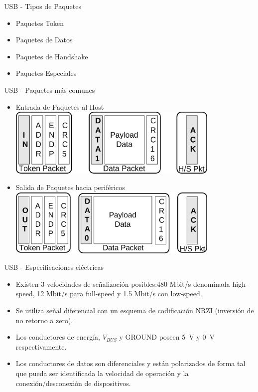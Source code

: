 \documentclass[11pt,a4paper]{beamer}
\begin{document}
			\begin{frame}{USB - Tipos de Paquetes}
				\begin{itemize}
					\item Paquetes Token
					\item Paquetes de Datos
					\item Paquetes de Handshake
					\item Paquetes Especiales
				\end{itemize}
			\end{frame}
			\begin{frame}{USB - Paquetes más comunes}
				\begin{itemize}
					\item Entrada de Paquetes al Host
					\includegraphics[width=0.8\textwidth]{15inpkt}
					\item Salida de Paquetes hacia periféricos
					\includegraphics[width=0.8\textwidth]{16outpkt}
				\end{itemize}
			\end{frame}
			\begin{frame}{USB - Especificaciones eléctricas}
				\begin{itemize}
					\item Existen 3 velocidades de señalización posibles:480 Mbit/s denominada high-speed, 12 Mbit/s para full-speed y 1.5 Mbit/s con low-speed.
					\item Se utiliza señal diferencial con un esquema de codificación NRZI (inversión de no retorno a zero).
					\item Los conductores de energía, $V_{BUS}$ y GROUND poseen \SI{5}{\volt} y \SI{0}{\volt} respectivamente.
					\item Los conductores de datos son diferenciales y están polarizados de forma tal que pueda ser identificada la velocidad de operación y la conexión/desconexión de dispositivos.
				\end{itemize}
			\end{frame}
\end{document}
